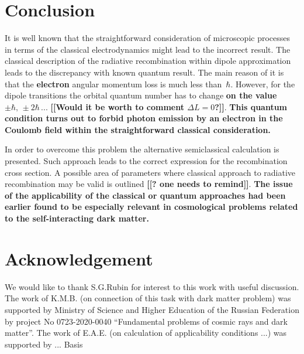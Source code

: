 \documentclass{SovJurn/JETPL}
\begin{document}
\section{Conclusion}
It is well known that the straightforward consideration of microscopic processes in terms of the classical electrodynamics might lead to the incorrect result. The classical description of the radiative recombination within dipole approximation leads to the discrepancy with known quantum result. The main reason of it is that the \textbf{electron} angular momentum loss is much less than~$\hbar$. However, for the dipole transitions the orbital quantum number has to change \textbf{on the value $\pm\hbar,\, \pm 2 \hbar\, ...$} \textbf{[[Would it be worth to comment $\Delta L=0$?]]}. \textbf{This quantum condition turns out to forbid photon emission by an electron in the Coulomb field within the straightforward classical consideration.}

In order to overcome this problem the alternative semiclassical calculation is presented. Such approach leads to the correct expression for the recombination cross section. A possible area of parameters where classical approach to radiative recombination may be valid is outlined \textbf{[[? one needs to remind]]}. \textbf{The issue of the applicability of the classical or quantum approaches had been earlier found to be especially relevant in cosmological problems related to the self-interacting dark matter.}

\section{Acknowledgement}

We would like to thank S.G.Rubin for interest to this work with useful discussion. The work of K.M.B. (on connection of this task with dark matter problem) was supported by Ministry of Science and Higher Education of the Russian Federation by project No 0723-2020-0040 “Fundamental problems of cosmic rays and dark matter”. The work of E.A.E. (on calculation of applicability conditions ...) was supported by ... Basis 


\end{document}
